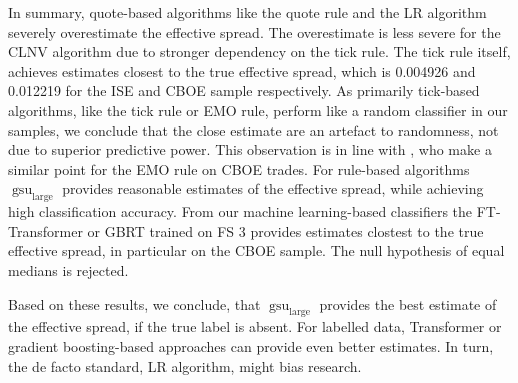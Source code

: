 In summary, quote-based algorithms like the quote rule and the \gls{LR} algorithm severely overestimate the effective spread. The overestimate is less severe for the \gls{CLNV} algorithm due to stronger dependency on the tick rule. The tick rule itself, achieves estimates closest to the true effective spread, which is \num[round-mode=places, round-precision=3]{0.004926} and \num[round-mode=places, round-precision=3]{0.012219} for the \gls{ISE} and \gls{CBOE} sample respectively. As primarily tick-based algorithms, like the tick rule or \gls{EMO} rule, perform like a random classifier in our samples, we conclude that the close estimate are an artefact to randomness, not due to superior predictive power. This observation is in line with \textcite[][897]{savickasInferringDirectionOption2003}, who make a similar point for the \gls{EMO} rule on \gls{CBOE} trades. For rule-based algorithms $\operatorname{gsu}_{\mathrm{large}}$ provides reasonable estimates of the effective spread, while achieving high classification accuracy. From our machine learning-based classifiers the FT-Transformer or \gls{GBRT} trained on FS 3 provides estimates clostest to the true effective spread, in particular on the \gls{CBOE} sample. The null hypothesis of equal medians is rejected.

Based on these results, we conclude, that  $\operatorname{gsu}_{\mathrm{large}}$ provides the best estimate of the effective spread, if the true label is absent. For labelled data, Transformer or gradient boosting-based approaches can provide even better estimates. In turn, the de facto standard, \gls{LR} algorithm, might bias research.